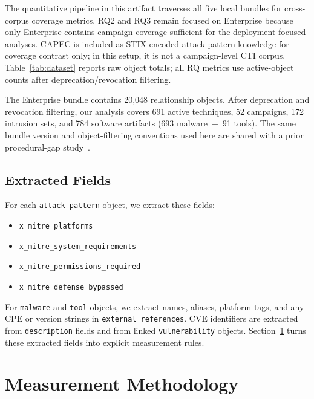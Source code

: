 \documentclass[sigconf,anonymous,review]{acmart}
\begin{document}
The quantitative pipeline in this artifact traverses all five local bundles for cross-corpus coverage metrics. RQ2 and RQ3 remain focused on Enterprise because only Enterprise contains campaign coverage sufficient for the deployment-focused analyses. CAPEC is included as STIX-encoded attack-pattern knowledge for coverage contrast only; in this setup, it is not a campaign-level CTI corpus. Table~\ref{tab:dataset} reports raw object totals; all RQ metrics use active-object counts after deprecation/revocation filtering.

The Enterprise bundle contains 20,048 relationship objects. After deprecation and revocation filtering, our analysis covers 691 active techniques, 52 campaigns, 172 intrusion sets, and 784 software artifacts (693 malware~$+$~91 tools). The same bundle version and object-filtering conventions used here are shared with a prior procedural-gap study~\cite{ferraz2026proceduralsemanticsgapstructured}.

\subsection{Extracted Fields}

For each \texttt{attack-pattern} object, we extract these fields:

\begin{itemize}[leftmargin=1.2em,itemsep=0.15em,topsep=0.15em]
\item \nolinkurl{x_mitre_platforms}
\item \nolinkurl{x_mitre_system_requirements}
\item \nolinkurl{x_mitre_permissions_required}
\item \nolinkurl{x_mitre_defense_bypassed}
\end{itemize}

For \texttt{malware} and \texttt{tool} objects, we extract names, aliases, platform tags, and any CPE or version strings in \nolinkurl{external_references}. CVE identifiers are extracted from \nolinkurl{description} fields and from linked \texttt{vulnerability} objects. Section~\ref{sec:methodology} turns these extracted fields into explicit measurement rules.


\section{Measurement Methodology}\label{sec:methodology}
\end{document}
